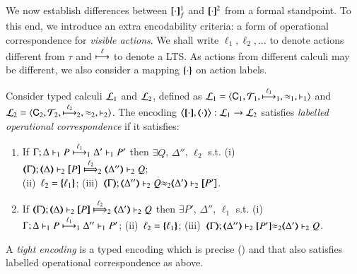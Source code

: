 We now establish differences between $\map{\cdot}_f^1$ and $\pmap{\cdot}{2}$ from a formal standpoint.
To this end, 
we introduce an extra encodability criteria: a form of operational correspondence 
for \emph{visible actions}. 
We shall write $\ell_1, \ell_2, \ldots$ to denote  
actions different from $\tau$
and  $\hby{\ell}$ to denote a LTS.
As actions from different calculi may be different, we also consider a mapping $\mapa{\cdot}$
on action labels. 

\begin{definition}%
\label{def:lopco}
       Consider typed calculi $\tyl{L}_1$ and  $\tyl{L}_2$, defined as 
        $\tyl{L}_1=\calc{\CAL_1}{{\cal{T}}_1}{\hby{{\ell_1}}_1}{\wb_1}{\proves_1}$
       and $\tyl{L}_2=\calc{\CAL_2}{{\cal{T}}_2}{\hby{{\ell_2}}_2}{\wb_2}{\proves_2}$.
The encoding $\enco{\map{\cdot}, \mapt{\cdot}}: \tyl{L}_1 \to \tyl{L}_2$ satisfies
\emph{labelled operational correspondence}
if it satisfies:
	\begin{enumerate}[1.]
			\item
					If		$\stytraargi{\Gamma}{\ell_1}{\Delta}{P}{\Delta'}{P'}{1}{1}$
					then	$\exists Q$, $\Delta''$, $\ell_2$ s.t. 
							(i)~$\wtytraargi{\mapt{\Gamma}}{\ell_2}{\mapt{\Delta}}{\map{P}}{\mapt{\Delta''}}{Q}{2}{2}$;  \\
							(ii)~$\ell_2 = \mapa{\ell_1}$; 
							(iii)~${\mapt{\Gamma}};{\mapt{\Delta''}}\proves_2 {Q}{\wb_2}{\mapt{\Delta'}}\proves_2 {\map{P'}}$.
				
			\item
					If		$\wtytraargi{\mapt{\Gamma}}{\ell_2}{\mapt{\Delta}}{\map{P}}{\mapt{\Delta'}}{Q}{2}{2}$
					then	$\exists P'$, $\Delta''$, $\ell_1$ s.t. 
							(i)~$\stytraargi{\Gamma}{\ell_1}{\Delta}{P}{\Delta''}{P'}{1}{1}$;
							(ii)~$\ell_2 = \mapa{\ell_1}$;
							(iii)~${\mapt{\Gamma}};{\mapt{\Delta''}}\proves_2 {\map{P'}}{\wb_2}{\mapt{\Delta'}}\proves_2 {Q}$.
	\end{enumerate}
A \emph{tight encoding} is a typed 
encoding 
which is precise () and that also satisfies 
labelled operational correspondence as above.
\end{definition}


